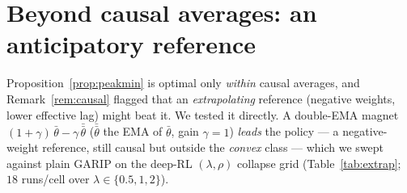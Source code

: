 \documentclass[10pt,twocolumn]{article}
\theoremstyle{plain}
\theoremstyle{remark}
\begin{document}
\section{Beyond causal averages: an anticipatory reference}
\label{sec:extrap}
Proposition~\ref{prop:peakmin} is optimal only \emph{within} causal averages, and
Remark~\ref{rem:causal} flagged that an \emph{extrapolating} reference (negative
weights, lower effective lag) might beat it. We tested it directly. A double-EMA
magnet $(1{+}\gamma)\,\bar\theta-\gamma\,\bar{\bar\theta}$ ($\bar{\bar\theta}$ the EMA
of $\bar\theta$, gain $\gamma{=}1$) \emph{leads} the policy --- a negative-weight
reference, still causal but outside the \emph{convex} class --- which we swept
against plain GARIP on the
deep-RL $(\lambda,\rho)$ collapse grid (Table~\ref{tab:extrap}; $18$ runs/cell over
$\lambda\!\in\!\{0.5,1,2\}$).

\begin{table}[h]
\centering
\caption{Collapse rate (exploit return $>0$) vs.\ averaging rate $\rho$ for the
causal running average (GARIP) and the anticipatory double-EMA magnet
(Coin Game; lower $=$ safer, bold). Anticipation widens the safe basin on the
\emph{stale} (slow-$\rho$) side but overshoots at \emph{fast} $\rho$. Here each cell
is $18$ runs ($\lambda\!\in\!\{0.5,1,2\}\times6$ seeds), \emph{not} the $40$ of
Table~\ref{tab:sens-coin} (which also includes the safe $\lambda\!=\!0.25$), so
GARIP's rates run higher; Wilson $95\%$ CIs are wide ($\sim\!\pm0.2$), e.g.\ the
$\rho\!=\!0.05$ overshoot is $2/18$, CI $[0.03,0.33]$.}
\label{tab:extrap}
\small
{}
\end{table}
\end{document}
